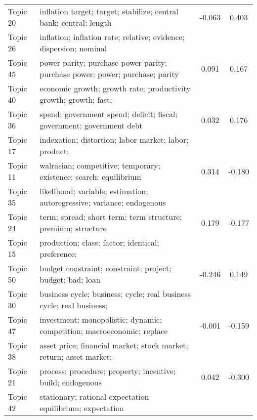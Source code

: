 \documentclass[
  12pt,
  onecolumn]{article}
\begin{document}
\begin{longtable}[t]{l>{\raggedright\arraybackslash}m{25em}cc}
Topic 20 & inflation
target;
target;
stabilize;
central
bank;
central;
length & -0.063 & 0.403\\
Topic 26 & inflation;
inflation
rate;
relative;
evidence;
dispersion;
nominal
\cellcolor{gray!6}{price} & \cellcolor{gray!6}{0.268} & \cellcolor{gray!6}{0.065}\\
Topic 45 & power
parity;
purchase
power
parity;
purchase
power;
power;
purchase;
parity & 0.091 & 0.167\\
Topic 40 & economic
growth;
growth
rate;
productivity
growth;
growth;
fast;
\cellcolor{gray!6}{region} & \cellcolor{gray!6}{0.198} & \cellcolor{gray!6}{0.058}\\
Topic 36 & spend;
government
spend;
deficit;
fiscal;
government;
government
debt & 0.032 & 0.176\\
\addlinespace
Topic 17 & indexation;
distortion;
labor
market;
labor;
product;
\cellcolor{gray!6}{corporate} & \cellcolor{gray!6}{-0.294} & \cellcolor{gray!6}{0.434}\\
Topic 11 & walrasian;
competitive;
temporary;
existence;
search;
equilibrium & 0.314 & -0.180\\
Topic 35 & likelihood;
variable;
estimation;
autoregressive;
variance;
endogenous
\cellcolor{gray!6}{variable} & \cellcolor{gray!6}{0.160} & \cellcolor{gray!6}{-0.127}\\
Topic 24 & term;
spread;
short
term;
term
structure;
premium;
structure & 0.179 & -0.177\\
Topic 15 & production;
class;
factor;
identical;
preference;
\cellcolor{gray!6}{input} & \cellcolor{gray!6}{0.121} & \cellcolor{gray!6}{-0.152}\\
\addlinespace
Topic 50 & budget
constraint;
constraint;
project;
budget;
bad;
loan & -0.246 & 0.149\\
Topic 30 & business
cycle;
business;
cycle;
real
business
cycle;
real
business;
\cellcolor{gray!6}{volatility} & \cellcolor{gray!6}{-0.112} & \cellcolor{gray!6}{-0.034}\\
Topic 47 & investment;
monopolistic;
dynamic;
competition;
macroeconomic;
replace & -0.001 & -0.159\\
Topic 38 & asset
price;
financial
market;
stock
market;
return;
asset
market;
\cellcolor{gray!6}{stock} & \cellcolor{gray!6}{-0.257} & \cellcolor{gray!6}{0.004}\\
Topic 21 & process;
procedure;
property;
incentive;
build;
endogenous & 0.042 & -0.300\\
\addlinespace
Topic 42 & stationary;
rational
expectation
equilibrium;
expectation

\end{longtable}
\end{document}
